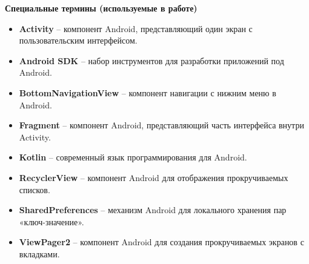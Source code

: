 \textbf{Специальные термины (используемые в работе)}

\begin{itemize}
	\item \textbf{Activity} – компонент Android, представляющий один экран с пользовательским интерфейсом.
	\item \textbf{Android SDK} – набор инструментов для разработки приложений под Android.
	\item \textbf{BottomNavigationView} – компонент навигации с нижним меню в Android.
	\item \textbf{Fragment} – компонент Android, представляющий часть интерфейса внутри Activity.
	\item \textbf{Kotlin} – современный язык программирования для Android.
	\item \textbf{RecyclerView} – компонент Android для отображения прокручиваемых списков.
	\item \textbf{SharedPreferences} – механизм Android для локального хранения пар «ключ-значение».
	\item \textbf{ViewPager2} – компонент Android для создания прокручиваемых экранов с вкладками.
\end{itemize}
